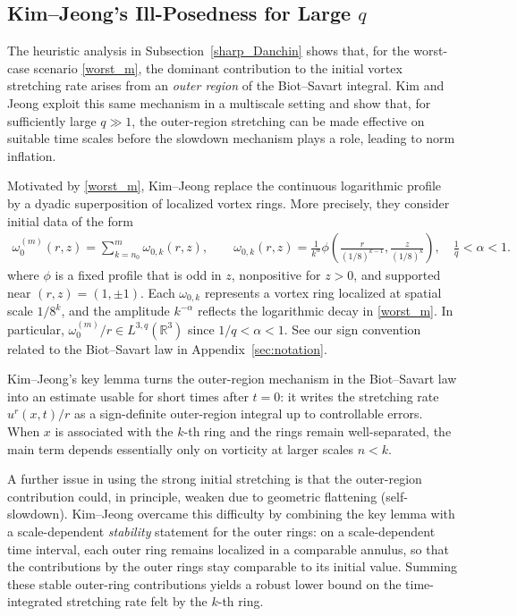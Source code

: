 \documentclass[reqno,11pt]{amsart}
\begin{document}
\subsection{Kim--Jeong's Ill-Posedness for Large \texorpdfstring{$q$}{q}}

The heuristic analysis in Subsection~\ref{sharp_Danchin} shows that, for the
worst-case scenario \eqref{worst_m}, the dominant contribution to the initial vortex
stretching rate arises from an \emph{outer region} of the Biot--Savart
integral. Kim and Jeong \cite{KimJeong22} exploit this same mechanism in a
multiscale setting and show that, for sufficiently large $q\gg1$, the
outer-region stretching can be made effective on suitable time scales before
the slowdown mechanism plays a role, leading to norm inflation.

Motivated by \eqref{worst_m}, Kim--Jeong replace the continuous logarithmic
profile by a dyadic superposition of localized vortex rings. More precisely,
they consider initial data of the form
\begin{align}
\label{KJdata}
    \omega_0^{(m)}(r,z)
    =
    \sum_{k=n_0}^{m} \omega_{0,k}(r,z),
    \qquad
    \omega_{0,k}(r,z)
    =
    \frac{1}{k^\alpha}
    \phi\!\left( \frac{r}{(1/8)^{k-1}}, \frac{z}{(1/8)^k} \right),
    \quad \frac{1}{q}<\alpha<1.
\end{align}
where $\phi$ is a fixed profile that is odd in $z$, nonpositive for $z>0$, and
supported near $(r,z)=(1,\pm1)$. Each $\omega_{0,k}$ represents a vortex ring
localized at spatial scale $1/8^k$, and the amplitude $k^{-\alpha}$ reflects the
logarithmic decay in \eqref{worst_m}. In particular, $\omega_0^{(m)}/r \in
L^{3,q}(\mathbb{R}^3)$ since $1/q<\alpha<1$.  See our sign convention related to the Biot--Savart law in Appendix~\ref{sec:notation}.




Kim--Jeong's key lemma turns the outer-region mechanism in the Biot--Savart law into an estimate usable for short times after $t=0$: it writes the stretching rate $u^r(x,t)/r$ as a sign-definite outer-region
integral up to controllable errors. When $x$ is associated with
the $k$-th ring and the rings remain well-separated, the main term depends essentially
only on vorticity at larger scales $n<k$. 


A further issue in using the strong initial stretching is that the outer-region contribution could, in principle, weaken
due to geometric flattening (self-slowdown). Kim--Jeong  overcame this difficulty by combining
the key lemma with a scale-dependent \emph{stability} statement for the outer rings:
on a scale-dependent time interval, each outer ring remains localized in a
comparable annulus, so that the contributions by the outer rings stay
comparable to its initial value. Summing these stable outer-ring contributions yields a
robust lower bound on the time-integrated stretching rate felt by the $k$-th ring. 
\end{document}
